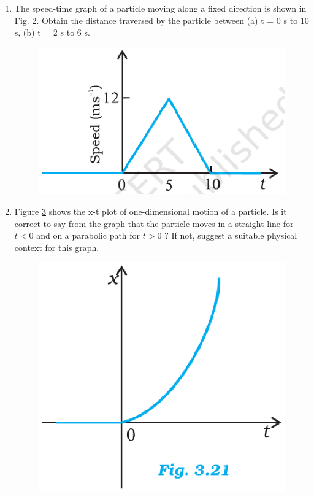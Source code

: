 \begin{enumerate}[label=\arabic*.,ref=\thesubsection.\theenumi]
\begin{figure}[!ht]
\caption{}
\label{fig:3.23}
\end{figure}
\item The speed-time graph of a particle moving along a fixed direction is shown in Fig. \ref{fig:3.28}. Obtain the distance traversed by the particle between (a) t = 0 s to 10 s, (b) t = 2 s to 6 s.
\begin{figure}[!ht]
\centering
\includegraphics[width=\columnwidth]{./curves/figs/11-1-3/3.28.eps}
\caption{}
\label{fig:3.28}
\end{figure}
%
\item Figure \ref{fig:3.21} shows the x-t plot of one-dimensional motion of a particle. Is it correct to say from the graph that the particle moves in a straight line for $t < 0$ and on a parabolic path for $t >0$ ? If not, suggest a suitable physical context for this graph.
\begin{figure}[!ht]
\centering
\includegraphics[width=\columnwidth]{./curves/figs/11-1-3/3.21.eps}
\caption{}
\label{fig:3.21}
\end{figure}

\end{enumerate}
